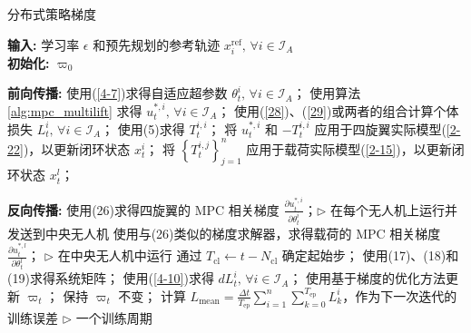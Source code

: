 \documentclass[lang=chs, degree=master, blindreview=false, winfonts=true]{yanputhesis}
\begin{document}
\begin{algorithm}[h]
    \caption{分布式策略梯度}
    \label{alg:distributed_pg}
    \textbf{输入:} 学习率 $\epsilon$ 和预先规划的参考轨迹 $x_i^{\text{ref}}, \, \forall i \in \mathcal{I}_A$\\
    \textbf{初始化:} $\varpi_0$
    
    \begin{algorithmic}[1]
                \State \textbf{前向传播:}
                \State 使用(\ref{4-7})求得自适应超参数 $\theta_t^i, \, \forall i \in \mathcal{I}_A$；
                \State 使用算法 \ref{alg:mpc_multilift} 求得 $u_t^{\ast,i}, \, \forall i \in \mathcal{I}_A$；
                \State 使用(\ref{28})、(\ref{29})或两者的组合计算个体损失 $L_t^i, \, \forall i \in \mathcal{I}_A$；
                    \State 使用(5)求得 $T_t^{i,i}$；
                    \State 将 $u_t^{\ast,i}$ 和 $-T_t^{i,i}$ 应用于四旋翼实际模型(\ref{2-22})，以更新闭环状态 $x_t^i$；
                \EndFor
                \State 将 $\left\{ T_t^{i,j} \right\}_{j=1}^n$ 应用于载荷实际模型(\ref{2-15})，以更新闭环状态 $x_t^l$；
                
                \State \textbf{反向传播:}
                    \State 使用(26)求得四旋翼的 MPC 相关梯度 $\frac{\partial u_t^{\ast,i}}{\partial \theta_t^i}$；$\triangleright$ 在每个无人机上运行并发送到中央无人机
                \EndFor
                \State 使用与(26)类似的梯度求解器，求得载荷的 MPC 相关梯度 $\frac{\partial u_t^{\ast,l}}{\partial \theta_t^l}$；
                \State $\triangleright$ 在中央无人机中运行
                    \State 通过 $T_{\text{cl}} \gets t - N_{\text{cl}}$ 确定起始步；
                    \State 使用(17)、(18)和(19)求得系统矩阵；
                    \State 使用(\ref{4-10})求得 $dL_t^i, \, \forall i \in \mathcal{I}_A$；
                    \State 使用基于梯度的优化方法更新 $\varpi_t$；
                \Else
                    \State 保持 $\varpi_t$ 不变；
                \EndIf
            \EndFor
            \State 计算 $L_{\text{mean}} = \frac{\Delta t}{T_{\text{ep}}} \sum_{i=1}^n \sum_{k=0}^{T_{\text{ep}}} L_k^i$，作为下一次迭代的训练误差 $\triangleright$ 一个训练周期
        \EndWhile
    \end{algorithmic}
\end{algorithm}
\end{document}
